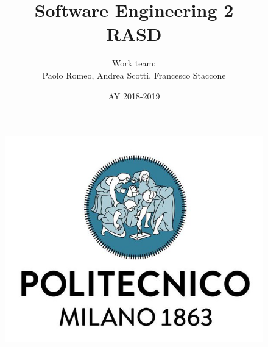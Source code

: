 \documentclass{article}
\begin{document}
	\begin{figure}
  	\includegraphics[width=\linewidth]{../images/Logo-PoliMi.jpg}
	\end{figure}
\title{\textbf{Software Engineering 2\\RASD}}
\author{Work team:\\Paolo Romeo, Andrea Scotti, Francesco Staccone}
\date{AY 2018-2019}
\maketitle{}
\end{document}
